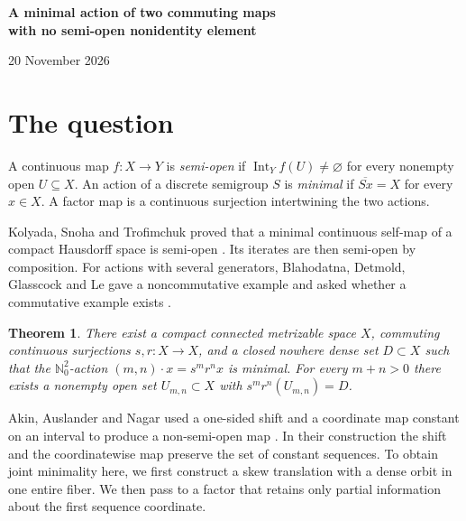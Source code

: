 \documentclass[11pt,a4paper]{article}
\newcommand{\NN}{\mathbb{N}_0}
\newcommand{\inter}{\operatorname{Int}}
\newtheorem{theorem}{Theorem}
\begin{document}
\begin{center}
{\LARGE\bfseries A minimal action of two commuting maps\\[2pt]
with no semi-open nonidentity element\par}
\vspace{6pt}
{\small 20 November 2026}
\end{center}

\begin{abstract}\noindent
We construct a minimal action of $\NN^2$ by continuous surjections on a compact
metrizable continuum. For each nonzero $(m,n)$, the corresponding map sends
a nonempty open set onto the same closed nowhere dense slice. The action is a
factor of a minimal action whose maps are all open. The construction answers
the commutative-semigroup question of Blahodatna, Detmold, Glasscock and Le
and gives a negative answer to the metrizable case of a question of Dai,
Feng, Lv and Xie on factor maps of minimal semiflows.
\end{abstract}

\section{The question}
A continuous map $f:X\to Y$ is \emph{semi-open} if $\inter_Y f(U)\ne\varnothing$
for every nonempty open $U\subseteq X$. An action of a discrete semigroup $S$
is \emph{minimal} if $\overline{Sx}=X$ for every $x\in X$.
A factor map is a continuous surjection intertwining the two actions.

Kolyada, Snoha and Trofimchuk proved that a minimal continuous self-map of
a compact Hausdorff space is semi-open \cite[Theorem 2.4(1)]{KST}. Its
iterates are then semi-open by composition. For actions with several
generators, Blahodatna, Detmold, Glasscock and Le gave a noncommutative
example and asked whether a commutative example exists
\cite[\S1.2, footnote~1]{BDGL}.

\begin{theorem}\label{thm:main}
There exist a compact connected metrizable space $X$, commuting continuous
surjections $s,r:X\to X$, and a closed nowhere dense set $D\subset X$ such
that the $\NN^2$-action $(m,n)\cdot x=s^m r^n x$ is minimal.
For every $m+n>0$ there exists a nonempty open set $U_{m,n}\subset X$
with $s^m r^n(U_{m,n})=D$.
\end{theorem}

Akin, Auslander and Nagar used a one-sided shift and a coordinate map
constant on an interval to produce a non-semi-open map
\cite[Example 2.30]{AAN}. In their construction the shift and the
coordinatewise map preserve the set of constant sequences. To obtain
joint minimality here, we first construct a skew translation with a dense
orbit in one entire fiber. We then pass to a factor that retains only
partial information about the first sequence coordinate.
\end{document}
